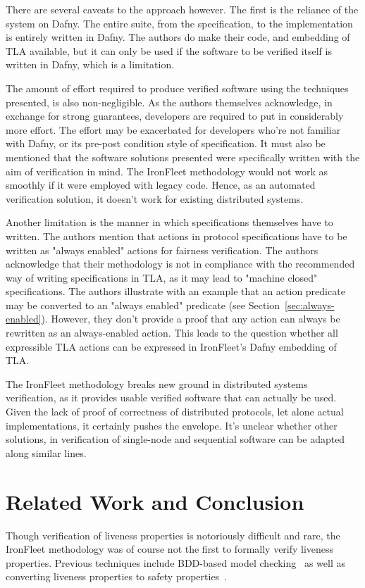 \documentclass{llncs}
\begin{document}
There are several caveats to the approach however. The first is the reliance of the system on Dafny.
 The entire suite, from the specification, to the implementation is entirely written in Dafny. The 
 authors do make their code, and embedding of TLA available, but it can only be used if the software
 to be verified itself is written in Dafny, which is a limitation. 

 The amount of effort required to produce verified software using the techniques presented, is also 
 non-negligible. As the authors themselves acknowledge, in exchange for strong guarantees, developers
 are required to put in considerably more effort. The effort may be exacerbated for developers who're 
 not familiar with Dafny, or its pre-post condition style of specification. 
 It must also be mentioned that the software solutions presented were specifically written with 
 the aim of verification in mind. The IronFleet methodology would not work as smoothly if it were
 employed with legacy code. Hence, as an automated verification solution, it doesn't work for 
 existing distributed systems. 

 Another limitation is the manner in which specifications themselves have to written. The 
 authors mention that actions in protocol specifications have to be written as "always enabled"
 actions for fairness verification. The authors acknowledge that their methodology is not 
 in compliance with the recommended way of writing specifications in TLA, as it may lead
 to "machine closed" specifications. The authors illustrate with an example that an action
 predicate may be converted to an "always enabled" predicate 
 (see Section~\ref{sec:always-enabled}). However, they don't provide a proof that any
 action can always be rewritten as an always-enabled action. This leads to the question
 whether all expressible TLA actions can be expressed in IronFleet's Dafny embedding of TLA.

 The IronFleet methodology breaks new ground in distributed systems verification, as it 
 provides usable verified software that can actually be used. Given the lack of proof of 
 correctness of distributed protocols, let alone actual implementations, it certainly 
 pushes the envelope. It's unclear whether other solutions, in verification of single-node and
 sequential software can be adapted along similar lines.


\section{Related Work and Conclusion}\label{sec:rel-work}
Though verification of liveness properties is notoriously difficult and rare,
the IronFleet methodology was of course not the first to formally verify
liveness properties. Previous techniques include BDD-based model
checking~\cite{Ravi2000} as well as converting liveness properties to safety
properties~\cite{Schuppan2006}.
\end{document}
